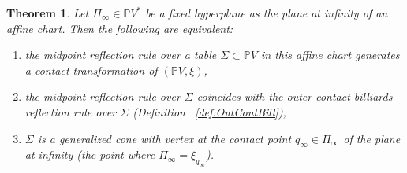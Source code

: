 \documentclass{article}
\newtheorem{thm}{Theorem}[section]
\begin{document}
\begin{thm}\label{thm:AffTable}
    Let $\Pi_\infty\in \mathbb{P}V^*$ be a fixed hyperplane as the plane at infinity of an 
    affine chart. Then the following are equivalent:
    \begin{enumerate}
        \item the midpoint reflection rule over a table $\Sigma\subset\mathbb{P}V$ in this 
        affine chart generates a contact transformation of $(\mathbb{P}V,\xi)$,
        \item the midpoint reflection rule over $\Sigma$ coincides with the outer contact 
        billiards reflection rule over $\Sigma$ (Definition ~\ref{def:OutContBill}),
        \item $\Sigma$ is a generalized cone with vertex at the contact point $q_\infty\in \Pi_\infty$ of the plane at infinity (the point where $\Pi_\infty = \xi_{q_\infty}$).
    \end{enumerate} 
\end{thm}
\end{document}
